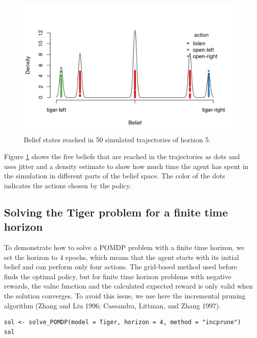 \begin{figure}
\includegraphics[width=1\linewidth]{pomdp_files/figure-latex/tiger-simulation-1} \caption{Belief states reached in 50 simulated trajectories of horizon 5.}\label{fig:tiger-simulation}
\end{figure}

Figure \ref{fig:tiger-simulation} shows the five beliefs that are
reached in the trajectories as dots and uses jitter and a density estimate to show how
much time the agent has spent in the simulation in different parts of the belief space. The color of the dots indicates the actions chosen by the policy.

\hypertarget{solving-the-tiger-problem-for-a-finite-time-horizon}{%
\subsection{Solving the Tiger problem for a finite time horizon}\label{solving-the-tiger-problem-for-a-finite-time-horizon}}

To demonstrate how to solve a POMDP problem with a finite time horizon,
we set the horizon to 4 epochs, which means that the agent starts with its initial
belief and can perform only four actions.
The grid-based method used before
finds the optimal policy, but for finite time horizon problems with negative rewards, the
value function and the calculated expected reward is only valid when the solution converges.
To avoid this issue, we use here the incremental pruning
algorithm (Zhang and Liu 1996; Cassandra, Littman, and Zhang 1997).

\begin{verbatim}
sol <- solve_POMDP(model = Tiger, horizon = 4, method = "incprune")
sol
\end{verbatim}

